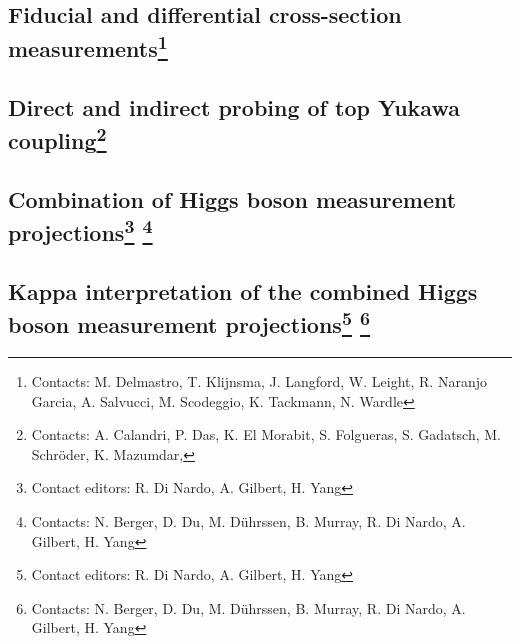 \documentclass[../report.tex]{subfiles}
\providecommand{\main}{..}
\begin{document}
\subsection[Fiducial and differential cross-section measurements]{Fiducial and differential cross-section measurements\footnote{Contacts: M. Delmastro, T. Klijnsma, J. Langford, W. Leight, R. Naranjo Garcia, A. Salvucci, M. Scodeggio, K. Tackmann, N. Wardle }}
\label{sec2:fiducial}



\subsection[Direct and indirect probing of top Yukawa coupling]{Direct and indirect probing of top Yukawa coupling\footnote{Contacts: A. Calandri,  P. Das, K. El Morabit, S. Folgueras, S. Gadatsch, M. Schr\"oder, K. Mazumdar,    
}}
\label{sec2:top}


\subsection[Combination of Higgs boson measurement projections]{Combination of Higgs boson measurement projections\footnote{Contact editors: R. Di Nardo, A. Gilbert, H. Yang}
\footnote{Contacts: N. Berger, D. Du, M. D\"uhrssen, B. Murray, R. Di Nardo, A. Gilbert, H. Yang}}
\label{sec2:exp_combination}


\subsection[Kappa interpretation of the combined Higgs boson measurement projections]{Kappa interpretation of the combined Higgs boson measurement projections\footnote{Contact editors: R. Di Nardo, A. Gilbert, H. Yang}
\footnote{Contacts: N. Berger, D. Du, M. D\"uhrssen, B. Murray, R. Di Nardo, A. Gilbert, H. Yang}}
\label{sec2:exp_kappa}

\end{document}
